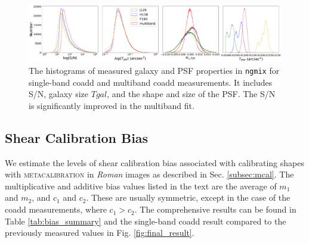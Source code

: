 \documentclass[fleqn,usenatbib]{mnras}
\begin{document}
\begin{figure}
    \centering
	\includegraphics[width=\textwidth]{ngmix_snr_T.pdf}
    \caption{The histograms of measured galaxy and PSF properties in \texttt{ngmix} for single-band coadd and multiband coadd measurements. It includes S/N, galaxy size $T{gal}$, and the shape and size of the PSF. The S/N is significantly improved in the multiband fit.}
    \label{fig:measured_properties}
\end{figure}


\subsection{Shear Calibration Bias}
\label{subsec:shapes}
We estimate the levels of shear calibration bias associated with calibrating shapes with \textsc{metacalibration} in \emph{Roman} images as described in Sec. \ref{subsec:mcal}. The multiplicative and additive bias values listed in the text are the average of $m_{1}$ and $m_{2}$, and $c_{1}$ and $c_{2}$. These are usually symmetric, except in the case of the coadd measurements, where $c_1>c_2$. The comprehensive results can be found in Table \ref{tab:bias_summary} and the single-band coadd result compared to the previously measured values in Fig. \ref{fig:final_result}.  
\end{document}

